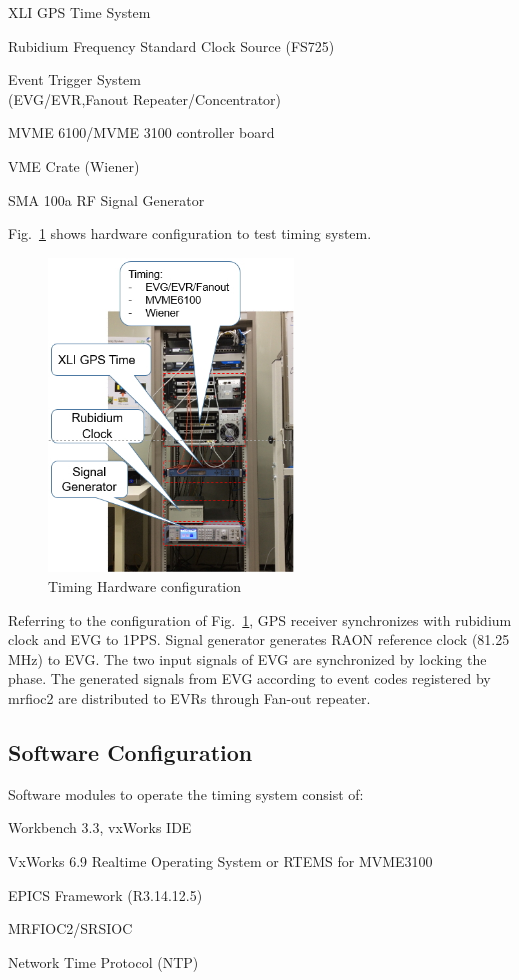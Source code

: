 \documentclass[a4paper,
              ]{jacow}
\begin{document}
\begin{Itemize}
	\item XLI GPS Time System
	\item Rubidium Frequency Standard Clock Source (FS725)
	\item Event Trigger System \\
	(EVG/EVR,Fanout Repeater/Concentrator)
	\item MVME 6100/MVME 3100 controller board 
	\item VME Crate (Wiener)
	\item SMA 100a RF Signal Generator
\end{Itemize}
\hfil\break
Fig.~\ref{timing:rack} shows hardware configuration to test timing system. 
\begin{figure}[!htb]
	\centering
	\includegraphics*[width=65mm]{WEPGF124f1}
	\caption{Timing Hardware configuration }
	\label{timing:rack}
\end{figure}

Referring to the configuration of Fig.~\ref{timing:rack}, GPS receiver synchronizes with rubidium clock and EVG to 1PPS. Signal generator generates RAON reference clock (81.25 MHz) to EVG. The two input signals of EVG are synchronized by locking the phase. The generated signals from EVG according to event codes registered by mrfioc2 are distributed to EVRs through Fan-out repeater.

\subsection{Software Configuration}
Software modules to operate the timing system consist of:
\begin{Itemize}
	\item Workbench 3.3, vxWorks IDE
	\item VxWorks 6.9 Realtime Operating System or RTEMS for MVME3100
	\item EPICS Framework (R3.14.12.5)
	\item MRFIOC2/SRSIOC 
	\item Network Time Protocol (NTP)
\end{Itemize}
\end{document}
